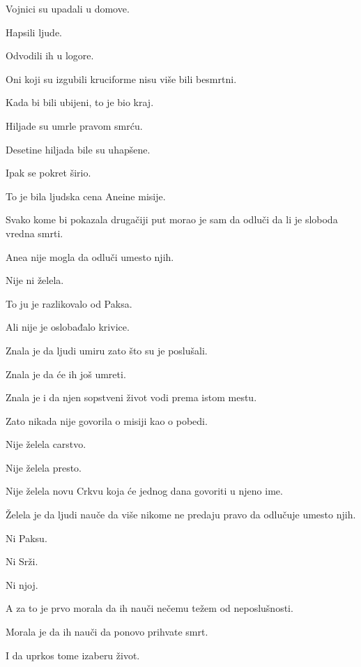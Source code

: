 \bigskip

Vojnici su upadali u domove.

Hapsili ljude.

Odvodili ih u logore.

\bigskip

Oni koji su izgubili kruciforme nisu više bili besmrtni.

Kada bi bili ubijeni, to je bio kraj.

\bigskip

Hiljade su umrle pravom smrću.

Desetine hiljada bile su uhapšene.

\bigskip

Ipak se pokret širio.

\bigskip

To je bila ljudska cena Aneine misije.

\bigskip

Svako kome bi pokazala drugačiji put morao je sam da odluči da li je sloboda vredna smrti.

\bigskip

Anea nije mogla da odluči umesto njih.

\bigskip

Nije ni želela.

\bigskip

To ju je razlikovalo od Paksa.

\bigskip

Ali nije je oslobađalo krivice.

\bigskip

Znala je da ljudi umiru zato što su je poslušali.

Znala je da će ih još umreti.

\bigskip

Znala je i da njen sopstveni život vodi prema istom mestu.

\bigskip

Zato nikada nije govorila o misiji kao o pobedi.

\bigskip

Nije želela carstvo.

Nije želela presto.

Nije želela novu Crkvu koja će jednog dana govoriti u njeno ime.

\bigskip

Želela je da ljudi nauče da više nikome ne predaju pravo da odlučuje umesto njih.

Ni Paksu.

Ni Srži.

Ni njoj.

\bigskip

A za to je prvo morala da ih nauči nečemu težem od neposlušnosti.

\bigskip

Morala je da ih nauči da ponovo prihvate smrt.

\bigskip

I da uprkos tome izaberu život.